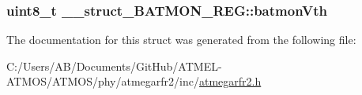 \hypertarget{struct____struct___b_a_t_m_o_n___r_e_g_aee94100d6595309656885edda06efb8d}{
\subsubsection[{batmon\-Vth}]{\setlength{\rightskip}{0pt plus 5cm}uint8\-\_\-t \-\_\-\-\_\-struct\-\_\-\-B\-A\-T\-M\-O\-N\-\_\-\-R\-E\-G\-::batmon\-Vth}}\label{struct____struct___b_a_t_m_o_n___r_e_g_aee94100d6595309656885edda06efb8d}


The documentation for this struct was generated from the following file\-:\begin{DoxyCompactItemize}
\item 
C\-:/\-Users/\-A\-B/\-Documents/\-Git\-Hub/\-A\-T\-M\-E\-L-\/\-A\-T\-M\-O\-S/\-A\-T\-M\-O\-S/phy/atmegarfr2/inc/\hyperlink{atmegarfr2_8h}{atmegarfr2.\-h}\end{DoxyCompactItemize}
